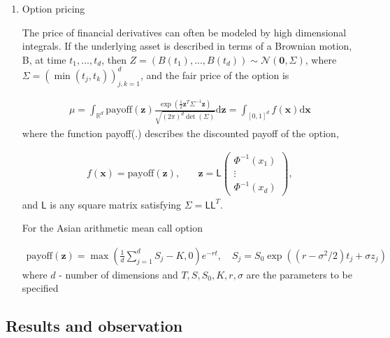 \documentclass[smallextended]{svjour3}       %
\newcommand{\bm}[1]{\boldsymbol{#1}}
\newcommand{\mSigma}{\Sigma}
\newcommand{\dif}[1]{\text{d}{#1}}
\newcommand{\reals}{\mathbb{R}}
\newcommand{\vx}{\bm{x}}
\newcommand{\dvx}{\dif{\bm{x}}}
\newcommand{\vz}{\bm{z}}
\newcommand{\dvz}{\dif{\bm{z}}}
\newcommand{\vzero}{\bm{0}}
\newcommand{\mL}{\mathsf{L}}
\newcommand{\calN}{\mathcal{N}}
\begin{document}
\begin{enumerate}







\item Option pricing


The price of financial derivatives can often be modeled by high dimensional integrals. If the underlying asset is described in terms of a Brownian motion, B, at time $t_1,...,t_d$, then $Z = (B(t_1), ..., B(t_d)) \sim \calN(\vzero,\mSigma)$, where $\mSigma = \left(\min(t_j,t_k) \right)_{j,k=1}^d$, and the fair price of the option is

\begin{align*}
\mu = \int_{\reals^d} \text{payoff}(\vz) \frac{\exp(\frac 12 \vz^T\mSigma^{-1}\vz)}{\sqrt{(2\pi)^d \det(\mSigma)}} \dvz = \int_{[0,1]^d} f(\vx) \dvx
\end{align*}
where the function payoff(.) describes the discounted payoff of the option,


\begin{align*}
f(\vx) = \text{payoff}(\vz), & \quad \vz = \mL 
\begin{pmatrix}
\Phi^{-1}(x_1) \\ \vdots \\ \Phi^{-1}(x_d)
\end{pmatrix},
\end{align*}
and $\mL$ is any square matrix satisfying $\mSigma = \mL \mL^T$.

For the Asian arithmetic mean call option

\begin{align*}
\text{payoff}(\vz) = \max\left( \frac 1d  \sum_{j=1}^d S_j - K, 0 \right) e^{-r t}, \quad
S_j = S_0 \exp((r-\sigma^2/2)t_j + \sigma z_j )
\end{align*}
where $d$ - number of dimensions and $T, S, S_0, K, r, \sigma$ are the parameters to be specified


\end{enumerate}














\subsection{Results and observation}
\end{document}
